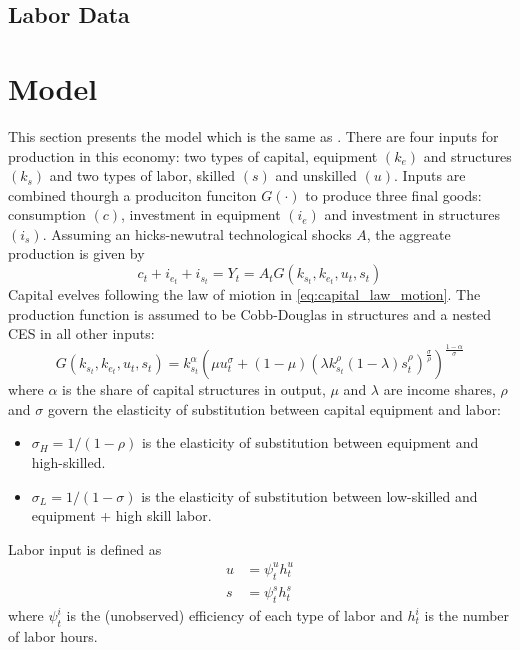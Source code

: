 \documentclass[12pt]{article}
\begin{document}
\subsection{Labor Data}\label{sec:labor_data}

\section{Model}\label{sec:model}
This section presents the model which is the same as \citep{krusell2000capital}. There are four inputs for production in this economy: two types of capital, equipment $(k_e)$ and structures $(k_s)$ and two types of labor, skilled $(s)$ and unskilled $(u)$. Inputs are combined thourgh a produciton funciton $G(\cdot)$ to produce three final goods: consumption $(c)$, investment in equipment $(i_e)$ and investment in structures $(i_s)$. Assuming an hicks-newutral technological shocks $A$, the aggreate production is given by
\begin{equation}\label{eq:production}
  c_t + i_{e_t} + i_{s_t} = Y_t =  A_t G(k_{s_t}, k_{e_t}, u_t, s_t)
\end{equation}
Capital evelves following the law of miotion in \eqref{eq:capital_law_motion}. The production function is assumed to be Cobb-Douglas in structures and a nested CES in all other inputs:
\begin{equation}\label{eq:production_fun}
  G(k_{s_t}, k_{e_t}, u_t, s_t) = k_{s_t}^\alpha\left( \mu u_t^\sigma + (1-\mu)\left(\lambda k_{s_t}^\rho (1-\lambda)s_t^\rho\right)^\frac{\sigma}{\rho}\right)^\frac{1-\alpha}{\sigma}
\end{equation}
where $\alpha$ is the share of capital structures in output, $\mu$  and $\lambda$  are income shares, $\rho$ and $\sigma$ govern the elasticity of substitution between capital equipment and labor:
\begin{itemize}
  \item $\sigma_{H} = 1/(1-\rho)$ is the elasticity of substitution between equipment and high-skilled.
  \item $\sigma_{L} = 1/(1-\sigma)$ is the elasticity of substitution between low-skilled and equipment + high skill labor.
\end{itemize}
Labor input is defined as 
\begin{align*}
  u &= \psi^u_t h^u_t\\
  s &= \psi^s_t h^s_t
\end{align*}
where $\psi^i_t$ is the (unobserved) efficiency of each type of labor and $h^i_t$ is the number of labor hours. 
\end{document}
